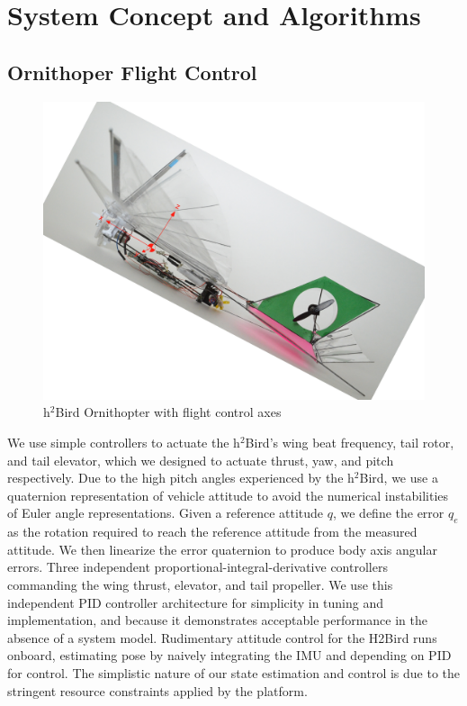 \documentclass[letterpaper, 10 pt, conference]{ieeeconf}
\begin{document}
\section{System Concept and Algorithms}

\subsection{Ornithoper Flight Control}

\begin{figure}[tb]
\centering
\includegraphics[width=\linewidth]{figures/h2bird_axes.jpg}
\caption{h$^2$Bird Ornithopter with flight control axes}
\label{fig:H2Bird}
\end{figure}

We use simple controllers to actuate the h$^2$Bird's wing beat frequency, tail rotor, and tail elevator, which we designed to actuate thrust, yaw, and pitch respectively. Due to the high pitch angles experienced by the h$^2$Bird, we use a quaternion representation of vehicle attitude to avoid the numerical instabilities of Euler angle representations. Given a reference attitude $q$, we define the error $q_e$ as the rotation required to reach the reference attitude from the measured attitude. We then linearize the error quaternion to produce body axis angular errors. Three independent proportional-integral-derivative controllers commanding the wing thrust, elevator, and tail propeller. We use this independent PID controller architecture for simplicity in tuning and implementation, and because it demonstrates acceptable performance in the absence of a system model.
Rudimentary attitude control for the H2Bird runs onboard, estimating pose by naively integrating the IMU and depending on PID for control. The simplistic nature of our state estimation and control is due to the stringent resource constraints applied by the platform.
\end{document}
